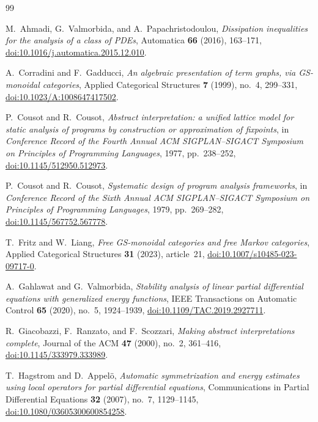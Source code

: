 \documentclass[10pt,journal,a4paper]{IEEEtran}
\theoremstyle{definition}
\begin{document}
\begin{thebibliography}{99}

M.~Ahmadi, G.~Valmorbida, and A.~Papachristodoulou,
\emph{Dissipation inequalities for the analysis of a class of PDEs},
Automatica \textbf{66} (2016), 163--171,
\href{https://doi.org/10.1016/j.automatica.2015.12.010}{doi:10.1016/j.automatica.2015.12.010}.

A.~Corradini and F.~Gadducci,
\emph{An algebraic presentation of term graphs, via GS-monoidal categories},
Applied Categorical Structures \textbf{7} (1999), no.~4, 299--331,
\href{https://doi.org/10.1023/A:1008647417502}{doi:10.1023/A:1008647417502}.

P.~Cousot and R.~Cousot,
\emph{Abstract interpretation: a unified lattice model for static analysis of programs by construction or approximation of fixpoints},
in \emph{Conference Record of the Fourth Annual ACM SIGPLAN--SIGACT Symposium on Principles of Programming Languages}, 1977, pp.~238--252,
\href{https://doi.org/10.1145/512950.512973}{doi:10.1145/512950.512973}.

P.~Cousot and R.~Cousot,
\emph{Systematic design of program analysis frameworks},
in \emph{Conference Record of the Sixth Annual ACM SIGPLAN--SIGACT Symposium on Principles of Programming Languages}, 1979, pp.~269--282,
\href{https://doi.org/10.1145/567752.567778}{doi:10.1145/567752.567778}.

T.~Fritz and W.~Liang,
\emph{Free GS-monoidal categories and free Markov categories},
Applied Categorical Structures \textbf{31} (2023), article~21,
\href{https://doi.org/10.1007/s10485-023-09717-0}{doi:10.1007/s10485-023-09717-0}.

A.~Gahlawat and G.~Valmorbida,
\emph{Stability analysis of linear partial differential equations with generalized energy functions},
IEEE Transactions on Automatic Control \textbf{65} (2020), no.~5, 1924--1939,
\href{https://doi.org/10.1109/TAC.2019.2927711}{doi:10.1109/TAC.2019.2927711}.

R.~Giacobazzi, F.~Ranzato, and F.~Scozzari,
\emph{Making abstract interpretations complete},
Journal of the ACM \textbf{47} (2000), no.~2, 361--416,
\href{https://doi.org/10.1145/333979.333989}{doi:10.1145/333979.333989}.

T.~Hagstrom and D.~Appel\"o,
\emph{Automatic symmetrization and energy estimates using local operators for partial differential equations},
Communications in Partial Differential Equations \textbf{32} (2007), no.~7, 1129--1145,
\href{https://doi.org/10.1080/03605300600854258}{doi:10.1080/03605300600854258}.


\end{thebibliography}
\end{document}
